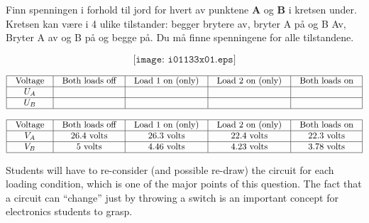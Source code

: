 

Finn spenningen i forhold til jord for hvert av punktene \textbf{A} og \textbf{B} i kretsen under. 
Kretsen kan være i 4 ulike tilstander: begger brytere av, bryter A på og B Av, Bryter A av og B på og begge på. Du må finne spenningene for alle tilstandene. 

$$\texttt{[image: i01133x01.eps]}$$


$$\vbox{\offinterlineskip
\halign{\strut
\vrule \quad\hfil # \ \hfil & 
\vrule \quad\hfil # \ \hfil & 
\vrule \quad\hfil # \ \hfil & 
\vrule \quad\hfil # \ \hfil & 
\vrule \quad\hfil # \ \hfil \vrule \cr
\noalign{\hrule}
%
Voltage & Both loads off & Load 1 on (only) & Load 2 on (only) & Both loads on \cr
%
\noalign{\hrule}
%
$U_A$ &  &  &  &  \cr
%
\noalign{\hrule}
%
$U_B$ &  &  &  &  \cr
%
\noalign{\hrule}
} %
}$$ %







$$\vbox{\offinterlineskip
\halign{\strut
\vrule \quad\hfil # \ \hfil & 
\vrule \quad\hfil # \ \hfil & 
\vrule \quad\hfil # \ \hfil & 
\vrule \quad\hfil # \ \hfil & 
\vrule \quad\hfil # \ \hfil \vrule \cr
\noalign{\hrule}
%
Voltage & Both loads off & Load 1 on (only) & Load 2 on (only) & Both loads on \cr
%
\noalign{\hrule}
%
$V_A$ & 26.4 volts & 26.3 volts & 22.4 volts & 22.3 volts \cr
%
\noalign{\hrule}
%
$V_B$ & 5 volts & 4.46 volts & 4.23 volts & 3.78 volts \cr
%
\noalign{\hrule}
} %
}$$ %







Students will have to re-consider (and possible re-draw) the circuit for each loading condition, which is one of the major points of this question.  The fact that a circuit can ``change'' just by throwing a switch is an important concept for electronics students to grasp.  

